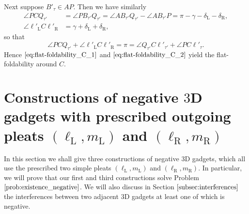\documentclass[11pt]{amsart}
\numberwithin{equation}{section}
\numberwithin{theorem}{section}
\newcommand{\Lt}{\ensuremath{\mathrm{L}}}
\newcommand{\Rt}{\ensuremath{\mathrm{R}}}
\begin{document}
Next suppose $B'_\tau\in AP$. 
Then we have similarly
\begin{align*}
\angle PCQ_{\tau'}&=\angle PB_{\tau'}Q_{\tau'}=\angle AB_{\tau'}Q_{\tau'}-\angle AB_{\tau'}P=\pi -\gamma -\delta_\Lt -\delta_\Rt ,\\
\angle\ell'_\Lt C\ell'_\Rt&=\gamma +\delta_\Lt +\delta_\Rt ,
\end{align*}
so that
\begin{equation}\label{eq:flat-foldability_C_2}
\angle PCQ_{\tau'}+\angle\ell'_\Lt C\ell'_\Rt =\pi =\angle Q_{\tau'}C\ell'_{\tau'}+\angle PC\ell'_\tau .
\end{equation}
Hence $\eqref{eq:flat-foldability_C_1}$ and $\eqref{eq:flat-foldability_C_2}$ yield the flat-foldability around $C$.

\section{Constructions of negative $3$D gadgets with prescribed outgoing pleats $(\ell_\Lt ,m_\Lt )$ and $(\ell_\Rt ,m_\Rt )$}\label{sec:negative_new}
In this section we shall give three constructions of negative $3$D gadgets,
which all use the prescribed two simple pleats $(\ell_\Lt ,m_\Lt )$ and $(\ell_\Rt ,m_\Rt )$.
In particular, we will prove that our first and third constructions solve Problem $\ref{prob:existence_negative}$.
We will also discuss in Section $\ref{subsec:interferences}$ the interferences between two adjacent $3$D gadgets at least one of which is negative.
\end{document}
